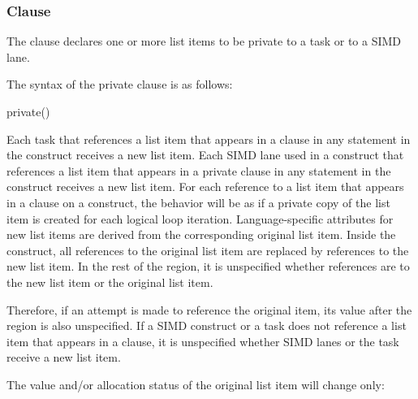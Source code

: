 \subsubsection{ Clause}
\label{subsubsec:private clause}
\summary
The  clause declares one or more list items to be private to a task or to a
SIMD lane.

\syntax
The syntax of the private clause is as follows:

\begin{ompSyntax}
private()
\end{ompSyntax}

\descr
Each task that references a list item that appears in a  clause in any statement
in the construct receives a new list item. Each SIMD lane used in a  construct that
references a list item that appears in a private clause in any statement in the construct
receives a new list item. For each reference to a list item that appears in a
 clause on a  construct, the behavior will be
as if a private copy of the list item is created for each logical loop
iteration. Language-specific attributes for new list items are derived from
the corresponding original list item. Inside the construct, all references to the original
list item are replaced by references to the new list item. In the rest of the region, it is
unspecified whether references are to the new list item or the original list item.

Therefore, if an attempt is made to reference the original item, its value after the region
is also unspecified. If a SIMD construct or a task does not reference a list item that
appears in a  clause, it is unspecified whether SIMD lanes or the task receive
a new list item.

The value and/or allocation status of the original list item will change only:

